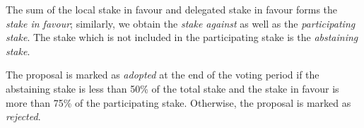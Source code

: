 The sum of the local stake in favour and delegated stake in favour forms the \emph{stake in favour}; similarly, we obtain the \emph{stake against} as well as the \emph{participating stake}. The stake which is not included in the participating stake is the \emph{abstaining stake}.

The proposal is marked as \emph{adopted} at the end of the voting period if the abstaining stake is less than 50\% of the total stake and the stake in favour is more than 75\% of the participating stake. Otherwise, the proposal is marked as \emph{rejected}.

%
%
